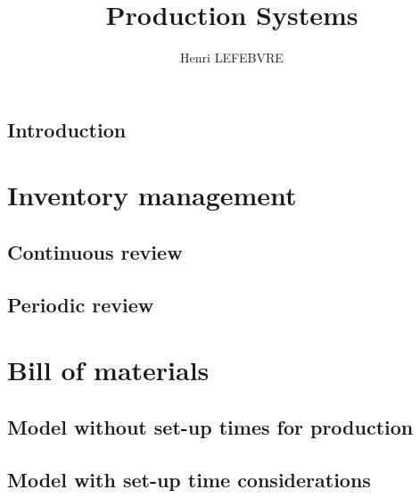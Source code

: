 \documentclass{report}
\title{Production Systems}
\author{Henri LEFEBVRE}
\begin{document}
\maketitle
\tableofcontents

\setlength\parskip{0.5cm}

\chapter*{Introduction}


\part{Inventory management}
\chapter{Continuous review}


\chapter{Periodic review}


\part{Bill of materials}
\chapter{Model without set-up times for production}

\chapter{Model with set-up time considerations}

\listoffigures
\end{document}

